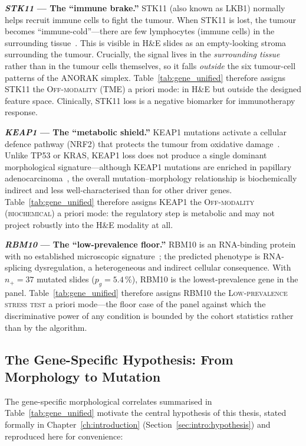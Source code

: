 \textbf{\textit{STK11} --- The ``immune brake.''}
STK11 (also known as LKB1) normally helps recruit immune cells to
fight the tumour.
When STK11 is lost, the tumour becomes ``immune-cold''---there are few
lymphocytes (immune cells) in the surrounding
tissue~\cite{skoulidis2015krassubsets,skoulidis2018stk11pd1}.
This is visible in H\&E slides as an empty-looking stroma surrounding
the tumour.
Crucially, the signal lives in the \emph{surrounding tissue} rather
than in the tumour cells themselves, so it falls \emph{outside} the
six tumour-cell patterns of the ANORAK simplex.
Table~\ref{tab:gene_unified} therefore assigns STK11 the
\textsc{Off-modality (TME)} a priori mode: in H\&E but outside the
designed feature space.
Clinically, STK11 loss is a negative biomarker for immunotherapy
response.

\textbf{\textit{KEAP1} --- The ``metabolic shield.''}
KEAP1 mutations activate a cellular defence pathway (NRF2) that
protects the tumour from oxidative damage~\cite{tcga2014luad}.
Unlike TP53 or KRAS, KEAP1 loss does not produce a single dominant
morphological signature---although KEAP1 mutations are enriched in
papillary adenocarcinoma~\cite{li2011keap1papillary}, the overall
mutation--morphology relationship is biochemically indirect and less
well-characterised than for other driver genes.
Table~\ref{tab:gene_unified} therefore assigns KEAP1 the
\textsc{Off-modality (biochemical)} a priori mode: the regulatory
step is metabolic and may not project robustly into the H\&E modality
at all.

\textbf{\textit{RBM10} --- The ``low-prevalence floor.''}
RBM10 is an RNA-binding protein with no established microscopic
signature~\cite{tcga2014luad}; the predicted phenotype is RNA-splicing
dysregulation, a heterogeneous and indirect cellular consequence.
With $n_+ = 37$ mutated slides ($p_g = 5.4$\,\%), RBM10 is the
lowest-prevalence gene in the panel.
Table~\ref{tab:gene_unified} therefore assigns RBM10 the
\textsc{Low-prevalence stress test} a priori mode---the floor case
of the panel against which the discriminative power of any
condition is bounded by the cohort statistics rather than by the
algorithm.


\subsection{The Gene-Specific Hypothesis: From Morphology to Mutation}
\label{sec:uc:central_hypothesis}

The gene-specific morphological correlates summarised in
Table~\ref{tab:gene_unified} motivate the central hypothesis of this
thesis, stated formally in Chapter~\ref{ch:introduction}
(Section~\ref{sec:intro:hypothesis}) and reproduced here for
convenience:

